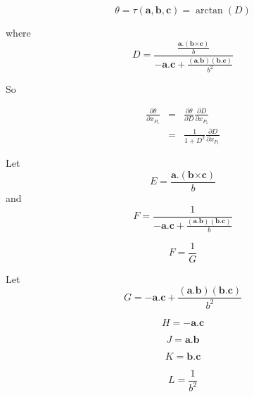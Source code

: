 \begin{displaymath}
  \theta = \tau(\mathbf{a},\mathbf{b},\mathbf{c}) =  \arctan(D)
\end{displaymath}

where
\begin{displaymath}
  D = \frac{\frac{\mathbf{a}.(\mathbf{b} \mathbf{\times}\mathbf{c})} {b}}{-\mathbf{a}.\mathbf{c}+\frac{(\mathbf{a}.\mathbf{b})(\mathbf{b}.\mathbf{c})}{b^2}}
\end{displaymath}

So

\begin{eqnarray}
  \label{eq:df}
  \frac{\partial \theta}{\partial x_{P_1}} & = & 
  \frac{\partial \theta}{\partial D} \frac{\partial D}{\partial x_{P_1}} \\
  & = & \frac{1}{1+D^2}\frac{\partial D}{\partial x_{P_1}}
\end{eqnarray}

Let
\begin{displaymath}
  E = \frac{\mathbf{a}.(\mathbf{b} \mathbf{\times}\mathbf{c})}{b}
\end{displaymath}
and 
\begin{displaymath}
  F = \frac{1}{-\mathbf{a}.\mathbf{c}+\frac{(\mathbf{a}.\mathbf{b})(\mathbf{b}.\mathbf{c})}{b}}
\end{displaymath}

\begin{equation}
  \label{eq:9}
  F = \frac{1}{G}
\end{equation}

Let
\begin{displaymath}
  G = -\mathbf{a}.\mathbf{c}+\frac{(\mathbf{a}.\mathbf{b})(\mathbf{b}.\mathbf{c})}{b^2}
\end{displaymath}

\begin{displaymath}
  H =  -\mathbf{a}.\mathbf{c}
\end{displaymath}

\begin{displaymath}
  J = \mathbf{a}.\mathbf{b}
\end{displaymath}

\begin{displaymath}
  K = \mathbf{b}.\mathbf{c}
\end{displaymath}

\begin{displaymath}
  L = \frac{1}{b^2}
\end{displaymath}

